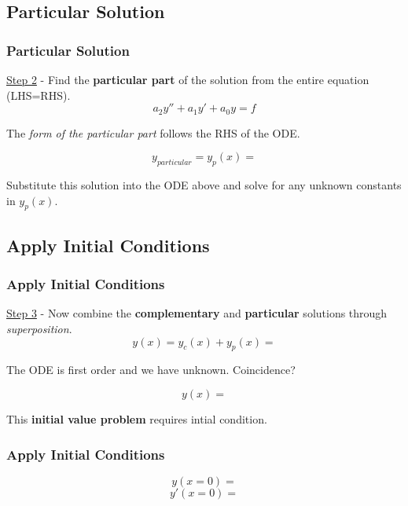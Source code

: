 \documentclass[fleqn]{beamer} %
\newcommand{\sectionIIIsubsectionIIItitle}{Particular Solution}
\newcommand{\sectionIIIsubsectionIVtitle}{Apply Initial Conditions}
\begin{document}
		\subsection{\sectionIIIsubsectionIIItitle}\label{sectionIIIsubsectionIII}

			\begin{frame}
				\frametitle{\sectionIIIsubsectionIIItitle}
				\bigskip

				\underline{Step 2} - Find the {\bf particular part} of the solution from the entire equation (LHS=RHS). \vspcc  
				\[a_2y''+a_1y'+a_0y=f\] 

				The {\it form of the particular part} follows the RHS of  the ODE. \vspc

				\[y_{particular}=y_p(x)=\]  

				Substitute this solution into the ODE above and solve for any unknown constants in $ y_p(x) $. 
								
				\btVFill
			\end{frame}

		\subsection{\sectionIIIsubsectionIVtitle}\label{sectionIIIsubsectionIV}	

			\begin{frame}
				\frametitle{\sectionIIIsubsectionIVtitle}
				\bigskip

				\underline{Step 3} - Now combine the {\bf complementary} and {\bf particular} solutions through {\it superposition}. \\

				\[y(x)=y_c(x)+y_p(x)=\] 

				The ODE is first order and we have \underline{\hspace{10mm}} unknown. Coincidence?\vspcc

				\[y(x)=\]  

				This {\bf initial value problem} requires \underline{\hspace{10mm}} intial condition.\vspace{2mm}\\
				
				\btVFill 
			\end{frame}

			\begin{frame}
				\frametitle{\sectionIIIsubsectionIVtitle}
				\bigskip

				\[y(x=0)=\] 
				\[y'(x=0)=\] 

		 		\btVFill 
			\end{frame}
			
\end{document}
